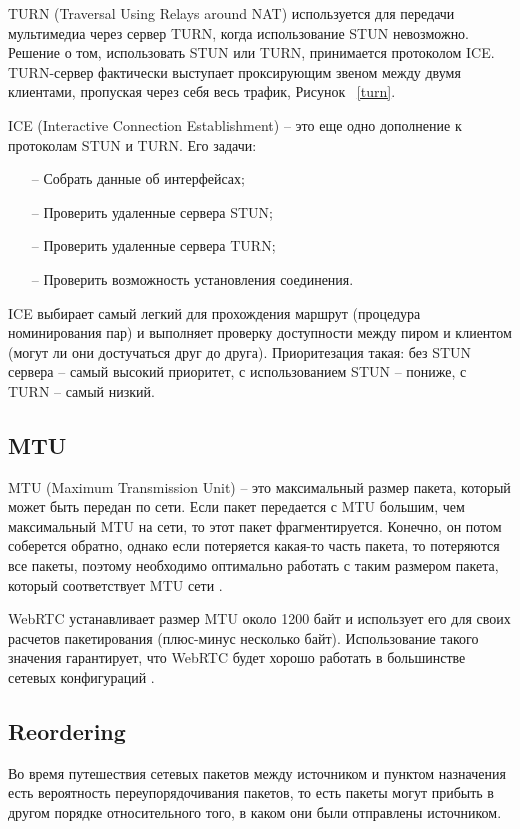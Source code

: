 TURN (Traversal Using Relays around NAT) используется для передачи мультимедиа через сервер TURN, когда использование STUN невозможно. Решение о том, использовать STUN или TURN, принимается протоколом ICE. TURN-сервер фактически выступает проксирующим звеном между двумя клиентами, пропуская через себя весь трафик, Рисунок ~\ref{turn}.

ICE (Interactive Connection Establishment) -- это еще одно дополнение к протоколам STUN и TURN. Его задачи:
\begin{itemize}
	\item[--] Собрать данные об интерфейсах;
        \item[--] Проверить удаленные сервера STUN;
        \item[--] Проверить удаленные сервера TURN;
        \item[--] Проверить возможность установления соединения.
\end{itemize}

ICE выбирает самый легкий для прохождения маршрут (процедура номинирования пар) и выполняет проверку доступности между пиром и клиентом (могут ли они достучаться друг до друга). Приоритезация такая: без STUN сервера -- самый высокий приоритет, с использованием STUN -- пониже, с TURN -- самый низкий.

\subsection{MTU}

MTU (Maximum Transmission Unit) -- это максимальный размер пакета, который может быть передан по сети. Если пакет передается с MTU большим, чем максимальный MTU на сети, то этот пакет фрагментируется. Конечно, он потом соберется обратно, однако если потеряется какая-то часть пакета, то потеряются все пакеты, поэтому необходимо оптимально работать с таким размером пакета, который соответствует MTU сети \cite{v4}.

WebRTC устанавливает размер MTU около 1200 байт и использует его для своих расчетов пакетирования (плюс-минус несколько байт). Использование такого значения гарантирует, что WebRTC будет хорошо работать в большинстве сетевых конфигураций \cite{v14}.

\subsection{Reordering}

Во время путешествия сетевых пакетов между источником и пунктом назначения есть вероятность переупорядочивания пакетов, то есть пакеты могут прибыть в другом порядке относительного того, в каком они были отправлены источником.

